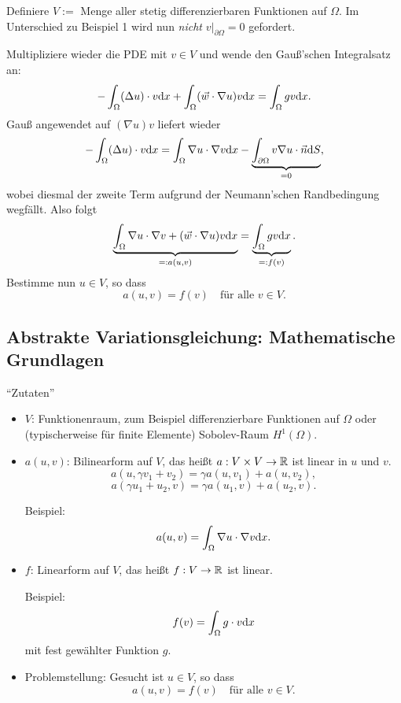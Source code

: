 Definiere $V :=$ Menge aller stetig differenzierbaren Funktionen auf $\Omega$.
Im Unterschied zu Beispiel 1 wird nun \emph{nicht} $v|_{\partial \Omega} = 0$
gefordert.

Multipliziere wieder die PDE mit $v \in V$ und wende den Gauß'schen Integralsatz
an:
\[ - \int_\Omega (\Delta u) \cdot v \mathrm{d} x
  + \int_\Omega (\vec{w} \cdot \nabla u) v \mathrm{d} x
  = \int_\Omega g v \mathrm{d} x. \]
Gauß angewendet auf $(\nabla u) v$ liefert wieder
\[ - \int_\Omega (\Delta u) \cdot v \mathrm{d} x
  = \int_\Omega \nabla u \cdot \nabla v \mathrm{d} x
  - \underbrace{\int_{\partial \Omega} v \nabla u \cdot \vec{n} \mathrm{d} S}_{=0},
\]
wobei diesmal der zweite Term aufgrund der Neumann'schen Randbedingung wegfällt.
Also folgt
\[ \underbrace{\int_\Omega \nabla u \cdot \nabla v
    + (\vec{w} \cdot \nabla u) v \mathrm{d} x}_{=: a(u,v)} =
  \underbrace{\int_\Omega g v \mathrm{d} x}_{=: f(v)}. \]
Bestimme nun $u \in V$, so dass
\[ a(u,v) = f(v) \quad \text{für alle } v \in V. \]

\subsection{Abstrakte Variationsgleichung: Mathematische Grundlagen}
``Zutaten''
\begin{itemize}
\item $V$: Funktionenraum, zum Beispiel differenzierbare Funktionen auf $\Omega$
  oder (typischerweise für finite Elemente) Sobolev-Raum $H^1(\Omega)$.
\item $a(u,v)$: Bilinearform auf $V$, das heißt $a : V \times V \to \mathbb{R}$ ist
  linear in $u$ und $v$.
  \[ a(u, \gamma v_1 + v_2) = \gamma a(u,v_1) + a(u,v_2), \]
  \[ a(\gamma u_1 + u_2, v) = \gamma a(u_1,v) + a(u_2,v). \]

  Beispiel:
  \[ a(u,v) = \int_\Omega \nabla u \cdot \nabla v \mathrm{d} x. \]
\item $f$: Linearform auf $V$, das heißt $f : V \to \mathbb{R}$ ist linear.

  Beispiel:
  \[ f(v) = \int_\Omega g \cdot v \mathrm{d} x \]
  mit fest gewählter Funktion $g$.
\item Problemstellung: Gesucht ist $u \in V$, so dass
  \[ a(u,v) = f(v) \quad \text{für alle } v \in V. \]  
\end{itemize}

